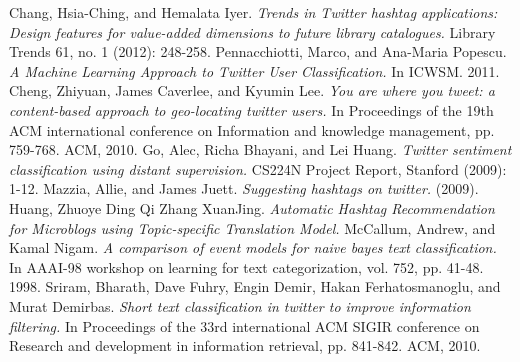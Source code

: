 \documentclass[conference]{IEEEtran}
\begin{document}
%
%
%
\begin{thebibliography}{8}

Chang, Hsia-Ching, and Hemalata Iyer. \emph{Trends in Twitter hashtag applications: Design features for value-added dimensions to future library catalogues.} Library Trends 61, no. 1 (2012): 248-258.
Pennacchiotti, Marco, and Ana-Maria Popescu. \emph{A Machine Learning Approach to Twitter User Classification.} In ICWSM. 2011.
Cheng, Zhiyuan, James Caverlee, and Kyumin Lee. \emph{You are where you tweet: a content-based approach to geo-locating twitter users.} In Proceedings of the 19th ACM international conference on Information and knowledge management, pp. 759-768. ACM, 2010.
Go, Alec, Richa Bhayani, and Lei Huang. \emph{Twitter sentiment classification using distant supervision.} CS224N Project Report, Stanford (2009): 1-12.
Mazzia, Allie, and James Juett. \emph{Suggesting hashtags on twitter.} (2009).
Huang, Zhuoye Ding Qi Zhang XuanJing. \emph{Automatic Hashtag Recommendation for Microblogs using Topic-specific Translation Model.}
McCallum, Andrew, and Kamal Nigam. \emph{A comparison of event models for naive bayes text classification.} In AAAI-98 workshop on learning for text categorization, vol. 752, pp. 41-48. 1998.
Sriram, Bharath, Dave Fuhry, Engin Demir, Hakan Ferhatosmanoglu, and Murat Demirbas. \emph{Short text classification in twitter to improve information filtering.} In Proceedings of the 33rd international ACM SIGIR conference on Research and development in information retrieval, pp. 841-842. ACM, 2010.

\end{thebibliography}

\end{document}

